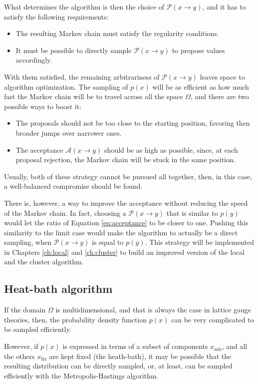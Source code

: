What determines the algorithm is then the choice of $\mathcal P(x\to y)$,
and it has to satisfy the following requirements:
\begin{itemize}
    \item The resulting Markov chain must satisfy the regularity conditions.
    \item It must be possible to directly sample $\mathcal P(x\to y)$ to propose values accordingly.
\end{itemize}

With them satisfied, the remaining arbitrariness of $\mathcal P(x\to y)$ leaves space to algorithm optimization.
The sampling of $p(x)$ will be as efficient as how much fast the Markov chain will be to travel across all the space $\Omega$,
and there are two possible ways to boost it:
\begin{itemize}
    \item The proposals should not be too close to the starting position, favoring then broader jumps over narrower ones.
    \item The acceptance $\mathcal A(x\to y)$ should be as high as possible, since, at each proposal rejection,
        the Markov chain will be stuck in the same position.
\end{itemize}
Usually, both of these strategy cannot be pursued all together, then, in this case, a well-balanced compromise should be found.

There is, however, a way to improve the acceptance without reducing the speed of the Markov chain.
In fact, choosing a $\mathcal P(x\to y)$ that is similar to $p(y)$ would let the ratio of Equation \eqref{eq:acceptance} to be closer to one.
Pushing this similarity to the limit case would make the algorithm to actually be a direct sampling, when $\mathcal P(x\to y)$ is equal to $p(y)$.
This strategy will be implemented in Chapters \ref{ch:local} and \ref{ch:cluster} to build an improved version of the local and the cluster algorithm.

\subsection*{Heat-bath algorithm}
If the domain $\Omega$ is multidimensional, and that is always the case in lattice gauge theories, then,
the probability density function $p(x)$ can be very complicated to be sampled efficiently.

However, if $p(x)$ is expressed in terms of a subset of components $x_\mathrm{sub}$, and all the others $x_\mathrm{fix}$ are kept fixed (the heath-bath),
it may be possible that the resulting distribution can be directly sampled, or, at least,
can be sampled efficiently with the Metropolis-Hastings algorithm.

